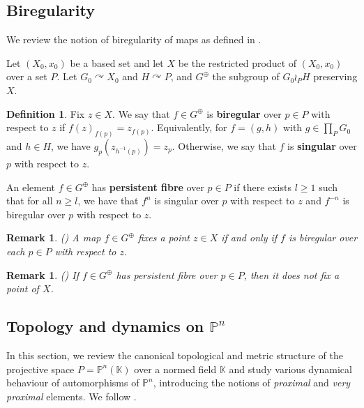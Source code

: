 \documentclass[12pt]{article}
\newtheorem{rem}[thm]{Remark}
\theoremstyle{definition}
\newtheorem{defn}[thm]{Definition}
\newcommand{\K}{\mathbb{K}}
\begin{document}
\subsection{Biregularity}
\label{biregularity}

We review the notion of biregularity of maps as defined in \cite[Section 4.1]{Algebraic}.

Let $(X_0,x_0)$ be a based set and let $X$ be the restricted product of $(X_0, x_0)$ over a set $P$. Let $G_0 \curvearrowright X_0$ and $H \curvearrowright P$, and $G^{\oplus}$ the subgroup of $G_0 \wr_P H$ preserving $X$. 

\begin{defn}
    Fix $z \in X$. We say that $f \in G^{\oplus}$ is \textbf{biregular} over $p \in P$ with respect to $z$ if $f(z)_{f(p)} = z_{f(p)}$. Equivalently, for $f = (g,h)$ with $g \in \prod_P G_0$ and $h \in H$, we have $g_p(z_{h^{-1}(p)}) = z_p$. Otherwise, we say that $f$ is \textbf{singular} over $p$ with respect to $z$. 

    An element $f \in G^{\oplus}$ has \textbf{persistent fibre} over $p \in P$ if there exists $l \geq 1$ such that for all $n \geq l$, we have that $f^n$ is singular over $p$ with respect to $z$ and $f^{-n}$ is biregular over $p$ with respect to $z$.
    
\end{defn}

\begin{rem}(\cite[Remark 4.5]{Algebraic})
    A map $f \in G^{\oplus}$ fixes a point $z \in X$ if and only if $f$ is biregular over each $p \in P$ with respect to $z$. 
\end{rem}

\begin{rem}(\cite[Remark 4.6]{Algebraic})
    If $f \in G^{\oplus}$ has persistent fibre over $p \in P$, then it does not fix a point of $X$. 
\end{rem}

\subsection{Topology and dynamics on $\mathbb{P}^n$}
\label{Top dynamics Pn}

In this section, we review the canonical topological and metric structure of the projective space $P = \mathbb{P}^n(\K)$ over a normed field $\K$ and study various dynamical behaviour of automorphisms of $\mathbb{P}^n$, introducing the notions of \emph{proximal} and \emph{very proximal} elements. We follow \cite[Section 2.9]{KapDrutu}. 
\end{document}
